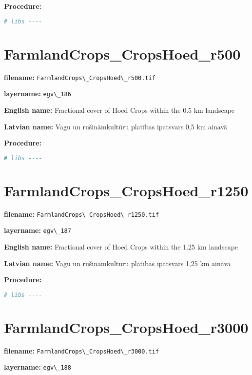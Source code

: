 \documentclass[
]{book}
\newcommand{\passthrough}[1]{#1}
\begin{document}
\textbf{Procedure:}

\begin{lstlisting}[language=R]
# libs ----
\end{lstlisting}

\section{FarmlandCrops\_CropsHoed\_r500}\label{ch06.186}

\textbf{filename:} \passthrough{\lstinline!FarmlandCrops\_CropsHoed\_r500.tif!}

\textbf{layername:} \passthrough{\lstinline!egv\_186!}

\textbf{English name:} Fractional cover of Hoed Crops within the 0.5 km landscape

\textbf{Latvian name:} Vagu un rušināmkultūru platības īpatsvars 0,5 km ainavā

\textbf{Procedure:}

\begin{lstlisting}[language=R]
# libs ----
\end{lstlisting}

\section{FarmlandCrops\_CropsHoed\_r1250}\label{ch06.187}

\textbf{filename:} \passthrough{\lstinline!FarmlandCrops\_CropsHoed\_r1250.tif!}

\textbf{layername:} \passthrough{\lstinline!egv\_187!}

\textbf{English name:} Fractional cover of Hoed Crops within the 1.25 km landscape

\textbf{Latvian name:} Vagu un rušināmkultūru platības īpatsvars 1,25 km ainavā

\textbf{Procedure:}

\begin{lstlisting}[language=R]
# libs ----
\end{lstlisting}

\section{FarmlandCrops\_CropsHoed\_r3000}\label{ch06.188}

\textbf{filename:} \passthrough{\lstinline!FarmlandCrops\_CropsHoed\_r3000.tif!}

\textbf{layername:} \passthrough{\lstinline!egv\_188!}
\end{document}
